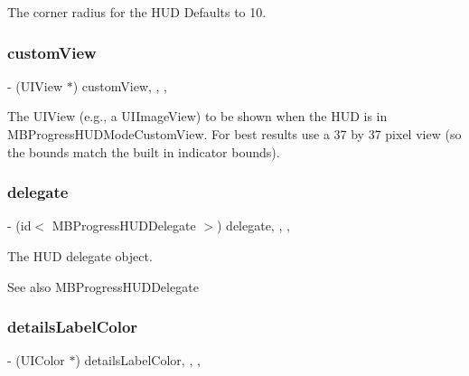 The corner radius for the H\+UD Defaults to 10. \mbox{\label{interface_m_b_progress_h_u_d_a9e150217d3d824f16ae10bafbcc6232e}} 
\subsubsection{\texorpdfstring{custom\+View}{customView}}
{\footnotesize\ttfamily -\/ (U\+I\+View $\ast$) custom\+View\hspace{0.3cm}{\ttfamily [read]}, {\ttfamily [write]}, {\ttfamily [atomic]}, {\ttfamily [assign]}}

The U\+I\+View (e.\+g., a U\+I\+Image\+View) to be shown when the H\+UD is in M\+B\+Progress\+H\+U\+D\+Mode\+Custom\+View. For best results use a 37 by 37 pixel view (so the bounds match the built in indicator bounds). \mbox{\label{interface_m_b_progress_h_u_d_a81a508c2375e4e97d5450bc3898ff7d9}} 
\subsubsection{\texorpdfstring{delegate}{delegate}}
{\footnotesize\ttfamily -\/ (id$<$ M\+B\+Progress\+H\+U\+D\+Delegate $>$) delegate\hspace{0.3cm}{\ttfamily [read]}, {\ttfamily [write]}, {\ttfamily [atomic]}, {\ttfamily [assign]}}

The H\+UD delegate object.

\begin{DoxySeeAlso}{See also}
M\+B\+Progress\+H\+U\+D\+Delegate 
\end{DoxySeeAlso}
\mbox{\label{interface_m_b_progress_h_u_d_a2542723377f9b99a7c9682bedb802a36}} 
\subsubsection{\texorpdfstring{details\+Label\+Color}{detailsLabelColor}}
{\footnotesize\ttfamily -\/ (U\+I\+Color $\ast$) details\+Label\+Color\hspace{0.3cm}{\ttfamily [read]}, {\ttfamily [write]}, {\ttfamily [atomic]}, {\ttfamily [assign]}}

